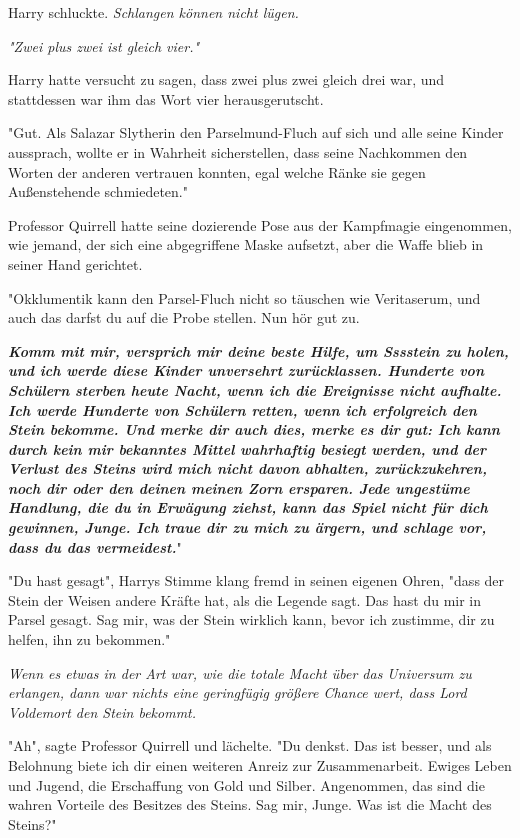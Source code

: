 {Harry schluckte. \emph{Schlangen können nicht lügen.}

\emph{"Zwei plus zwei ist gleich vier."}

Harry hatte versucht zu sagen, dass zwei plus zwei gleich drei war, und stattdessen war ihm das Wort vier herausgerutscht.

"Gut. Als Salazar Slytherin den Parselmund-Fluch auf sich und alle seine Kinder aussprach, wollte er in Wahrheit sicherstellen, dass seine Nachkommen den Worten der anderen vertrauen konnten, egal welche Ränke sie gegen Außenstehende schmiedeten."

Professor Quirrell hatte seine dozierende Pose aus der Kampfmagie eingenommen, wie jemand, der sich eine abgegriffene Maske aufsetzt, aber die Waffe blieb in seiner Hand gerichtet.

"Okklumentik kann den Parsel-Fluch nicht so täuschen wie Veritaserum, und auch das darfst du auf die Probe stellen. Nun hör gut zu.

\textbf{\emph{Komm mit mir, versprich mir deine beste Hilfe, um Sssstein zu holen, und ich werde diese Kinder unversehrt zurücklassen. Hunderte von Schülern sterben heute Nacht, wenn ich die Ereignisse nicht aufhalte. Ich werde Hunderte von Schülern retten, wenn ich erfolgreich den Stein bekomme. Und merke dir auch dies, merke es dir gut: Ich kann durch kein mir bekanntes Mittel wahrhaftig besiegt werden, und der Verlust des Steins wird mich nicht davon abhalten, zurückzukehren, noch dir oder den deinen meinen Zorn ersparen. Jede ungestüme Handlung, die du in Erwägung ziehst, kann das Spiel nicht für dich gewinnen, Junge. Ich traue dir zu mich zu ärgern, und schlage vor, dass du das vermeidest.}}"

"Du hast gesagt", Harrys Stimme klang fremd in seinen eigenen Ohren, "dass der Stein der Weisen andere Kräfte hat, als die Legende sagt. Das hast du mir in Parsel gesagt. Sag mir, was der Stein wirklich kann, bevor ich zustimme, dir zu helfen, ihn zu bekommen."

\emph{Wenn es etwas in der Art war, wie die totale Macht über das Universum zu erlangen, dann war nichts eine geringfügig größere Chance wert, dass Lord Voldemort den Stein bekommt.}

"Ah", sagte Professor Quirrell und lächelte. "Du denkst. Das ist besser, und als Belohnung biete ich dir einen weiteren Anreiz zur Zusammenarbeit. Ewiges Leben und Jugend, die Erschaffung von Gold und Silber. Angenommen, das sind die wahren Vorteile des Besitzes des Steins. Sag mir, Junge. Was ist die Macht des Steins?"

}

